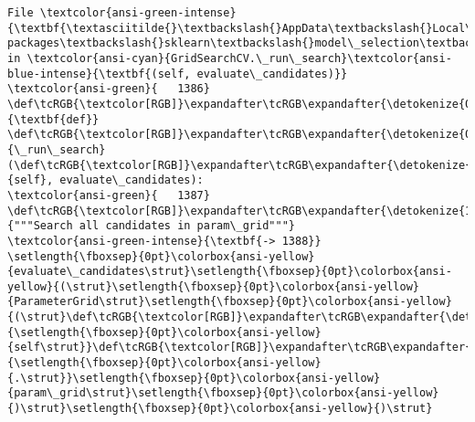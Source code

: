 \documentclass[11pt]{article}
\begin{document}
\begin{Verbatim}[commandchars=\\\{\}, frame=single, framerule=2mm, rulecolor=\color{outerrorbackground}]
File \textcolor{ansi-green-intense}{\textbf{\textasciitilde{}\textbackslash{}AppData\textbackslash{}Local\textbackslash{}anaconda3\textbackslash{}lib\textbackslash{}site-packages\textbackslash{}sklearn\textbackslash{}model\_selection\textbackslash{}\_search.py:1388}}, in \textcolor{ansi-cyan}{GridSearchCV.\_run\_search}\textcolor{ansi-blue-intense}{\textbf{(self, evaluate\_candidates)}}
\textcolor{ansi-green}{   1386} \def\tcRGB{\textcolor[RGB]}\expandafter\tcRGB\expandafter{\detokenize{0,135,0}}{\textbf{def}} \def\tcRGB{\textcolor[RGB]}\expandafter\tcRGB\expandafter{\detokenize{0,0,255}}{\_run\_search}(\def\tcRGB{\textcolor[RGB]}\expandafter\tcRGB\expandafter{\detokenize{0,135,0}}{self}, evaluate\_candidates):
\textcolor{ansi-green}{   1387}     \def\tcRGB{\textcolor[RGB]}\expandafter\tcRGB\expandafter{\detokenize{175,0,0}}{"""Search all candidates in param\_grid"""}
\textcolor{ansi-green-intense}{\textbf{-> 1388}}     \setlength{\fboxsep}{0pt}\colorbox{ansi-yellow}{evaluate\_candidates\strut}\setlength{\fboxsep}{0pt}\colorbox{ansi-yellow}{(\strut}\setlength{\fboxsep}{0pt}\colorbox{ansi-yellow}{ParameterGrid\strut}\setlength{\fboxsep}{0pt}\colorbox{ansi-yellow}{(\strut}\def\tcRGB{\textcolor[RGB]}\expandafter\tcRGB\expandafter{\detokenize{0,135,0}}{\setlength{\fboxsep}{0pt}\colorbox{ansi-yellow}{self\strut}}\def\tcRGB{\textcolor[RGB]}\expandafter\tcRGB\expandafter{\detokenize{98,98,98}}{\setlength{\fboxsep}{0pt}\colorbox{ansi-yellow}{.\strut}}\setlength{\fboxsep}{0pt}\colorbox{ansi-yellow}{param\_grid\strut}\setlength{\fboxsep}{0pt}\colorbox{ansi-yellow}{)\strut}\setlength{\fboxsep}{0pt}\colorbox{ansi-yellow}{)\strut}


\end{Verbatim}
\end{document}
